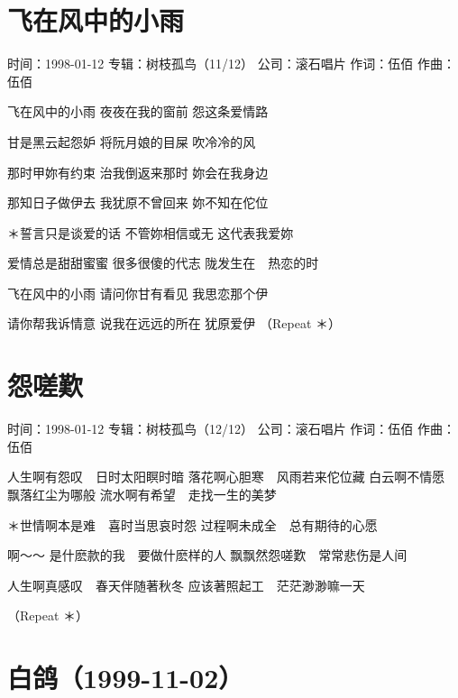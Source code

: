 \documentclass[UTF8,a4paper,oneside,twocolumn,12pt]{ctexbook}
\newcommand{\infopair}[2]{\textbullet #1：#2}
\newcommand{\zc}[1][伍佰]{\infopair{作词}{#1}}
\newcommand{\zq}[1][伍佰]{\infopair{作曲}{#1}}
\newcommand{\zj}[1]{\infopair{专辑}{#1}}
\newcommand{\sj}[1]{\infopair{时间}{#1}}
\newcommand{\gs}[1]{\infopair{公司}{#1}}
\newenvironment{info}{\begin{flushleft}\kaishu
	}
	{\end{flushleft}\normalsize\yahei\par}
\newenvironment{lyric}{
	}
{}
\begin{document}
\section{飞在风中的小雨}
\begin{info}
	\sj{1998-01-12}
	\zj{树枝孤鸟（11/12）}
	\gs{滚石唱片}
	\zc
	\zq
\end{info}
\begin{lyric}
	飞在风中的小雨
	夜夜在我的窗前
	怨这条爱情路

	甘是黑云起怨妒
	将阮月娘的目屎
	吹冷冷的风

	那时甲妳有约束
	治我倒返来那时
	妳会在我身边

	那知日子做伊去
	我犹原不曾回来
	妳不知在佗位

	＊誓言只是谈爱的话
	不管妳相信或无
	这代表我爱妳

	爱情总是甜甜蜜蜜
	很多很傻的代志
	陇发生在　热恋的时

	飞在风中的小雨
	请问你甘有看见
	我思恋那个伊

	请你帮我诉情意
	说我在远远的所在
	犹原爱伊
	（Repeat ＊）
\end{lyric}

\section{怨嗟歎}
\begin{info}
	\sj{1998-01-12}
	\zj{树枝孤鸟（12/12）}
	\gs{滚石唱片}
	\zc
	\zq
\end{info}
\begin{lyric}
	人生啊有怨叹　日时太阳瞑时暗
	落花啊心胆寒　风雨若来佗位藏
	白云啊不情愿　飘落红尘为哪般
	流水啊有希望　走找一生的美梦

	＊世情啊本是难　喜时当思哀时怨
	过程啊未成全　总有期待的心愿

	啊～～
	是什麽款的我　要做什麽样的人
	飘飘然怨嗟歎　常常悲伤是人间

	人生啊真感叹　春天伴随著秋冬
	应该著照起工　茫茫渺渺嘛一天

	（Repeat ＊）
\end{lyric}


\section*{白鸽（1999-11-02）}
\end{document}
